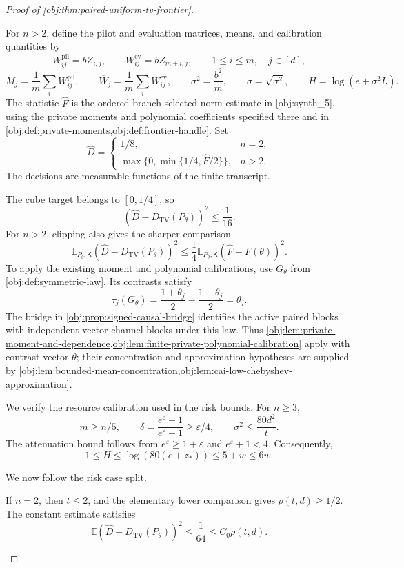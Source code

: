 \begin{proof}[Proof of \cref{obj:thm:paired-uniform-tv-frontier}]
\begin{enumerate}
For \(n>2\), define the pilot and evaluation matrices, means, and calibration quantities by
\[
W^{\mathrm{pil}}_{ij}=bZ_{i,j},\qquad
W^{\mathrm{ev}}_{ij}=bZ_{m+i,j},
\qquad 1\le i\le m,\quad j\in[d],
\]
\[
M_j=\frac1m\sum_iW^{\mathrm{pil}}_{ij},\qquad
\overline W_j=\frac1m\sum_iW^{\mathrm{ev}}_{ij},
\qquad
\sigma^2=\frac{b^2}{m},\qquad \sigma=\sqrt{\sigma^2},
\qquad H=\log(e+\sigma^2L).
\]
The statistic \(\widehat F\) is the ordered branch-selected norm estimate in
\cref{obj:synth_5}, using the private moments and polynomial coefficients specified there and in \cref{obj:def:private-moments,obj:def:frontier-handle}.
Set
\[
\widehat D=
\begin{cases}
1/8,&n=2,\\
\max\{0,\min\{1/4,\widehat F/2\}\},&n>2.
\end{cases}
\]
The decisions are measurable functions of the finite transcript.

The cube target belongs to \([0,1/4]\), so
\[
(\widehat D-D_{\mathrm{TV}}(P_\theta))^2\le\frac1{16}.
\]
For \(n>2\), clipping also gives the sharper comparison
\[
\mathbb E_{P_\theta,\mathsf K}
(\widehat D-D_{\mathrm{TV}}(P_\theta))^2
\le\frac14
\mathbb E_{P_\theta,\mathsf K}(\widehat F-F(\theta))^2.
\]
To apply the existing moment and polynomial calibrations, use \(G_\theta\) from
\cref{obj:def:symmetric-law}. Its contrasts satisfy
\[
\tau_j(G_\theta)
=\frac{1+\theta_j}{2}-\frac{1-\theta_j}{2}
=\theta_j.
\]
The bridge in \cref{obj:prop:signed-causal-bridge} identifies the active paired blocks with independent vector-channel blocks under this law. Thus
\cref{obj:lem:private-moment-and-dependence,obj:lem:finite-private-polynomial-calibration}
apply with contrast vector \(\theta\); their concentration and approximation hypotheses are supplied by
\cref{obj:lem:bounded-mean-concentration,obj:lem:cai-low-chebyshev-approximation}.

We verify the resource calibration used in the risk bounds. For \(n\ge3\),
\[
m\ge n/5,\qquad
\delta=\frac{e^\varepsilon-1}{e^\varepsilon+1}\ge\varepsilon/4,
\qquad
\sigma^2\le\frac{80d^2}{t}.
\]
The attenuation bound follows from \(e^\varepsilon\ge1+\varepsilon\) and
\(e^\varepsilon+1<4\).
Consequently,
\[
1\le H\le\log(80(e+z_*))
\le5+w\le6w.
\]

We now follow the risk case split.

If \(n=2\), then \(t\le2\), and the elementary lower comparison gives
\(\rho(t,d)\ge1/2\). The constant estimate satisfies
\[
\mathbb E(\widehat D-D_{\mathrm{TV}}(P_\theta))^2
\le\frac1{64}\le C_0\rho(t,d).
\]


\end{enumerate}
\end{proof}
